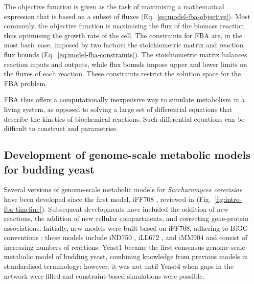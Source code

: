 The objective function is given as the task of maximising a mathematical expression that is based on a subset of fluxes (Eq.\ \ref{eq:model-fba-objective}).
Most commonly, the objective function is maximising the flux of the biomass reaction, thus optimising the growth rate of the cell.
The constraints for FBA are, in the most basic case, imposed by two factors:
the stoichiometric matrix and reaction flux bounds (Eq.\ \ref{eq:model-fba-constraints}).
The stoichiometric matrix balances reaction inputs and outputs, while flux bounds impose upper and lower limits on the fluxes of each reaction.
These constraints restrict the solution space for the FBA problem.

FBA thus offers a computationally inexpensive way to simulate metabolism in a living system, as opposed to solving a large set of differential equations that describe the kinetics of biochemical reactions.
Such differential equations can be difficult to construct and parametrise.


\subsection{Development of genome-scale metabolic models for budding yeast}
\label{subsec:intro-fba-gemm}

Several versions of genome-scale metabolic models for \textit{Saccharomyces cerevisiae} have been developed since the first model, iFF708 \parencite{forsterGenomeScaleReconstructionSaccharomyces2003}, reviewed in \textcite{chenGenomescaleModelingYeast2022} (Fig.\ \ref{fig:intro-fba-timeline}).
Subsequent developments have included the addition of new reactions, the addition of new cellular compartments, and correcting gene-protein associations.
Initially, new models were built based on iFF708, adhering to BiGG conventions \parencite{norsigianBiGGModels20202020}; these models include iND750 \parencite{duarteReconstructionValidationSaccharomyces2004}, iLL672 \parencite{nookaewGenomescaleMetabolicModel2008}, and iMM904 \parencite{moConnectingExtracellularMetabolomic2009} and consist of increasing numbers of reactions.
Yeast1 \parencite{herrgardConsensusYeastMetabolic2008} became the first consensus genome-scale metabolic model of budding yeast, combining knowledge from previous models in standardised terminology; however, it was not until Yeast4 \parencite{dobsonFurtherDevelopmentsGenomescale2010} when gaps in the network were filled and constraint-based simulations were possible.

